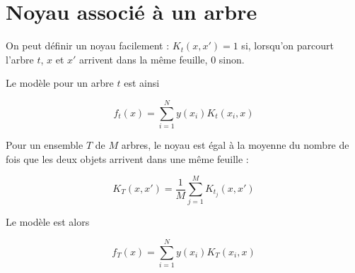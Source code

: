 	\section{Noyau associé à un arbre}
	
	On peut définir un noyau facilement : $K_t(x, x') = 1$ si, lorsqu'on parcourt l'arbre $t$, $x$ et $x'$ arrivent dans la même feuille, $0$ sinon.
	
	Le modèle pour un arbre $t$ est ainsi
	
	$$f_t(x) = \sum_{i = 1}^N y(x_i) K_t(x_i, x)$$
	
	Pour un ensemble $T$ de $M$ arbres, le noyau est égal à la moyenne du nombre de fois que les deux objets arrivent dans une même feuille :
	
	$$K_T(x, x') = \frac{1}{M} \sum_{j = 1}^M K_{t_j}(x, x')$$
	
	Le modèle est alors
	
	$$f_T(x) = \sum_{i = 1}^N y(x_i) K_T(x_i, x)$$